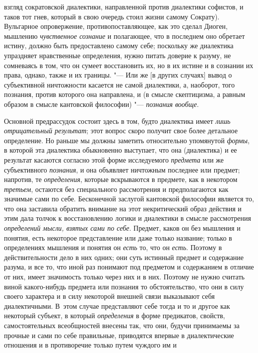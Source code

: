 взгляд сократовской диалектики, направленной против диалектики софистов, и
таков тот гнев, который в свою очередь стоил жизни самому Сократу).
Вульгарное опровержение, противопоставляющее, как это сделал Диоген,
мышлению {\em чувственное сознание}
и полагающее, что в последнем оно обретает истину, должно
быть предоставлено самому себе; поскольку же диалектика упраздняет
нравственные определения, нужно питать доверие к разуму, не сомневаясь в
том, что он сумеет восстановить их, но в их истине и в сознании их права,
однако, также и их границы. "--- Или же [в других случаях]
вывод о субъективной ничтожности касается не самой диалектики, а, наоборот,
того познания, против которого она направлена, и (в смысле скептицизма, а
равным образом в смысле кантовской философии) "--- {\em познания вообще}.

Основной предрассудок состоит здесь в том, будто диалектика
имеет {\em лишь отрицательный
результат}; этот вопрос скоро получит свое более детальное
определение. Но раньше мы должны заметить относительно упомянутой
{\em формы}, в которой
эта диалектика обыкновенно выступает, что она (диалектика) и ее результат
касаются согласно этой форме исследуемого {\em предмета} или же
субъективного {\em познания}, и она объявляет ничтожным последнее или
предмет; напротив, те {\em определения},
которые вскрываются в предмете, как в некотором {\em третьем}, остаются
без специального рассмотрения и предполагаются как значимые сами по себе.
\label{bkm:bm126a}Бесконечной заслугой кантовской философии
является то, что она заставила обратить внимание на этот некритический
образ действия и этим дала толчок к восстановлению логики и диалектики в
смысле рассмотрения {\em определений
мысли, взятых сами по себе}. Предмет, каков он без мышления
и понятия, есть некоторое представление или даже только название; только в
определениях мышления и понятия он {\em есть} то, что он {\em есть}. Поэтому
в действительности дело в них одних; они суть истинный предмет и содержание
разума, и все то, что иной раз понимают под предметом и содержанием в
отличие от них, имеет значимость только через них и в них. Поэтому не нужно
считать виной какого-нибудь предмета или познания то обстоятельство, что
они в силу своего характера и в силу некоторой внешней связи выказывают
себя диалектичными. В~этом случае представляют себе тогда и то и другое как
некоторый субъект, в который {\em определения} в форме
предикатов, свойств, самостоятельных всеобщностей внесены так, что они,
будучи принимаемы за прочные и сами по себе правильные, приводятся впервые
в диалектические отношения и в противоречие только путем чуждого им и
